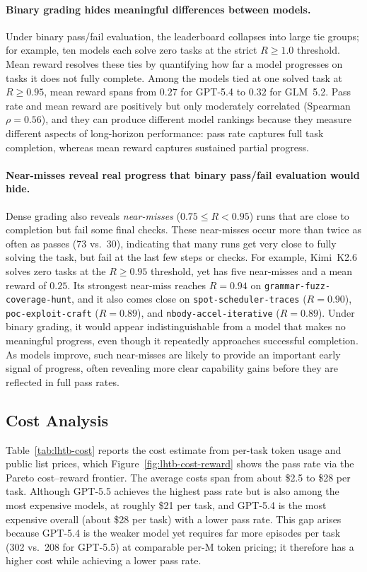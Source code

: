 \paragraph{Binary grading hides meaningful differences between models.}
%
Under binary pass/fail evaluation, the leaderboard collapses into large tie groups; for example, ten models each solve zero tasks at the strict $R \geq 1.0$ threshold.
%
Mean reward resolves these ties by quantifying how far a model progresses on tasks it does not fully complete.
%
Among the models tied at one solved task at $R\geq0.95$, mean reward spans from $0.27$ for GPT-5.4 to $0.32$ for GLM~5.2.
%
Pass rate and mean reward are positively but only moderately correlated (Spearman $\rho = 0.56$), and they can produce different model rankings because they measure different aspects of long-horizon performance: pass rate captures full task completion, whereas mean reward captures sustained partial progress.


\paragraph{Near-misses reveal real progress that binary pass/fail evaluation would hide.}
%
Dense grading also reveals \emph{near-misses} ($0.75 \leq R < 0.95$) runs that are close to completion but fail some final checks.
%
These near-misses occur more than twice as often as passes ($73$ vs.\ $30$), indicating that many runs get very close to fully solving the task, but fail at the last few steps or checks.
%
For example, Kimi~K2.6 solves zero tasks at the $R \geq 0.95$ threshold, yet has five near-misses and a mean reward of $0.25$.
%
Its strongest near-miss reaches $R = 0.94$ on \texttt{grammar-fuzz-coverage-hunt}, and it also comes close on \texttt{spot-scheduler-traces} ($R = 0.90$), \texttt{poc-exploit-craft} ($R = 0.89$), and \texttt{nbody-accel-iterative} ($R = 0.89$).
%
Under binary grading, it would appear indistinguishable from a model that makes no meaningful progress, even though it repeatedly approaches successful completion.
%
As models improve, such near-misses are likely to provide an important early signal of progress, often revealing more clear capability gains before they are reflected in full pass rates.



\subsection{Cost Analysis}
Table~\ref{tab:lhtb-cost} reports the cost estimate from per-task token usage and public list prices, which Figure~\ref{fig:lhtb-cost-reward} shows the pass rate via the Pareto cost--reward frontier.
%
The average costs span from about \$2.5 to \$28 per task.
%
Although GPT-5.5 achieves the highest pass rate but is also among the most expensive models, at roughly \$21 per task, and GPT-5.4 is the most expensive overall (about \$28 per task) with a lower pass rate.
%
This gap arises because GPT-5.4 is the weaker model yet requires far more episodes per task (302 vs.\ 208 for GPT-5.5) at comparable per-M token pricing; it therefore has a higher cost while achieving a lower pass rate.
%

